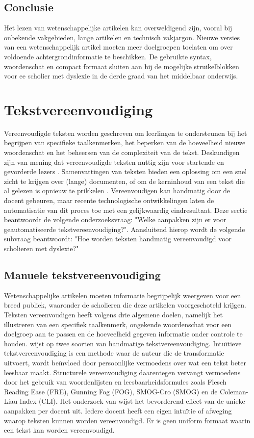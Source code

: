 \subsection{Conclusie}

Het lezen van wetenschappelijke artikelen kan overweldigend zijn, vooral bij onbekende vakgebieden, lange artikelen en technisch vakjargon. Nieuwe versies van een wetenschappelijk artikel moeten meer doelgroepen toelaten om over voldoende achtergrondinformatie te beschikken. De gebruikte syntax, woordenschat en compact formaat sluiten aan bij de mogelijke struikelblokken voor ee scholier met dyslexie in de derde graad van het middelbaar onderwijs. 

\section{Tekstvereenvoudiging}
Vereenvoudigde teksten worden geschreven om leerlingen te ondersteunen bij het begrijpen van specifieke taalkenmerken, het beperken van de hoeveelheid nieuwe woordenschat en het beheersen van de complexiteit van de tekst. Deskundigen zijn van mening dat vereenvoudigde teksten nuttig zijn voor startende en gevorderde lezers \autocite{Louwerse2007}. Samenvattingen van teksten bieden een oplossing om een snel zicht te krijgen over (lange) documenten, of om de kerninhoud van een tekst die al gelezen is opnieuw te prikkelen \autocite{McCombes2022}. Vereenvoudigen kan handmatig door de docent gebeuren, maar recente technologische ontwikkelingen laten de automatisatie van dit proces toe met een gelijkwaardig eindresultaat. Deze sectie beantwoordt de volgende onderzoeksvraag: "Welke aanpakken zijn er voor geautomatiseerde tekstvereenvoudiging?". Aansluitend hierop wordt de volgende subvraag beantwoordt: "Hoe worden teksten handmatig vereenvoudigd voor scholieren met dyslexie?"

\subsection{Manuele tekstvereenvoudiging}

Wetenschappelijke artikelen moeten informatie begrijpelijk weergeven voor een breed publiek, waaronder de scholieren die deze artikelen voorgeschoteld krijgen. Teksten vereenvoudigen heeft volgens \textcite{Crossley2012} drie algemene doelen, namelijk het illustreren van een specifiek taalkenmerk, ongekende woordenschat voor een doelgroep aan te passen en de hoeveelheid gegeven informatie onder controle te houden. \textcite{Crossley2012} wijst op twee soorten van handmatige tekstvereenvoudiging. Intuïtieve tekstvereenvoudiging is een methode waar de auteur die de transformatie uitvoert, wordt beïnvloed door persoonlijke vermoedens over wat een tekst beter leesbaar maakt. Structurele vereenvoudiging daarentegen vervangt vermoedens door het gebruik van woordenlijsten en leesbaarheidsformules zoals Flesch Reading Ease (FRE), Gunning Fog (FOG), SMOG-Cro (SMOG) en de Coleman-Liau Index (CLI). Het onderzoek van \textcite{Crossley2012} wijst het bevorderend effect van de unieke aanpakken per docent uit. Iedere docent heeft een eigen intuïtie of afweging waarop teksten kunnen worden vereenvoudigd. Er is geen uniform formaat waarin een tekst kan worden vereenvoudigd. 

